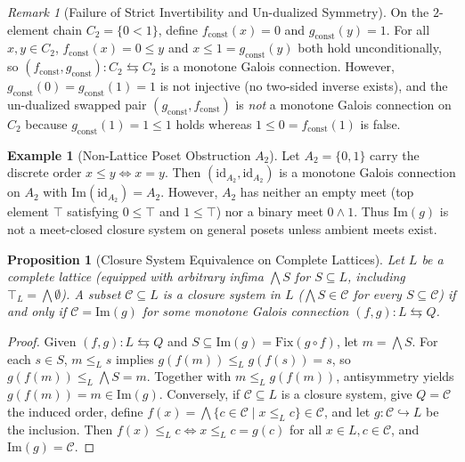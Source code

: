 \documentclass[11pt,a4paper]{article}
\newtheorem{proposition}[theorem]{Proposition}
\theoremstyle{definition}
\newtheorem{example}[theorem]{Example}
\theoremstyle{remark}
\newtheorem{remark}[theorem]{Remark}
\begin{document}
\begin{remark}[Failure of Strict Invertibility and Un-dualized Symmetry]\label{rem:non-inv}
On the $2$-element chain $C_2 = \{0 < 1\}$, define $f_{\mathrm{const}}(x) = 0$ and $g_{\mathrm{const}}(y) = 1$. For all $x, y \in C_2$, $f_{\mathrm{const}}(x) = 0 \le y$ and $x \le 1 = g_{\mathrm{const}}(y)$ both hold unconditionally, so $(f_{\mathrm{const}}, g_{\mathrm{const}}) : C_2 \leftrightarrows C_2$ is a monotone Galois connection. However, $g_{\mathrm{const}}(0) = g_{\mathrm{const}}(1) = 1$ is not injective (no two-sided inverse exists), and the un-dualized swapped pair $(g_{\mathrm{const}}, f_{\mathrm{const}})$ is \emph{not} a monotone Galois connection on $C_2$ because $g_{\mathrm{const}}(1) = 1 \le 1$ holds whereas $1 \le 0 = f_{\mathrm{const}}(1)$ is false.
\end{remark}

\begin{example}[Non-Lattice Poset Obstruction $A_2$]\label{ex:antichain}
Let $A_2 = \{0, 1\}$ carry the discrete order $x \le y \iff x = y$. Then $(\mathrm{id}_{A_2}, \mathrm{id}_{A_2})$ is a monotone Galois connection on $A_2$ with $\mathrm{Im}(\mathrm{id}_{A_2}) = A_2$. However, $A_2$ has neither an empty meet (top element $\top$ satisfying $0 \le \top$ and $1 \le \top$) nor a binary meet $0 \wedge 1$. Thus $\mathrm{Im}(g)$ is not a meet-closed closure system on general posets unless ambient meets exist.
\end{example}

\begin{proposition}[Closure System Equivalence on Complete Lattices]\label{prop:complete-closure}
Let $L$ be a complete lattice (equipped with arbitrary infima $\bigwedge S$ for $S \subseteq L$, including $\top_L = \bigwedge \emptyset$). A subset $\mathcal{C} \subseteq L$ is a \emph{closure system} in $L$ ($\bigwedge S \in \mathcal{C}$ for every $S \subseteq \mathcal{C}$) if and only if $\mathcal{C} = \mathrm{Im}(g)$ for some monotone Galois connection $(f, g) : L \leftrightarrows Q$.
\end{proposition}

\begin{proof}
Given $(f, g) : L \leftrightarrows Q$ and $S \subseteq \mathrm{Im}(g) = \mathrm{Fix}(g \circ f)$, let $m = \bigwedge S$. For each $s \in S$, $m \le_L s$ implies $g(f(m)) \le_L g(f(s)) = s$, so $g(f(m)) \le_L \bigwedge S = m$. Together with $m \le_L g(f(m))$, antisymmetry yields $g(f(m)) = m \in \mathrm{Im}(g)$. Conversely, if $\mathcal{C} \subseteq L$ is a closure system, give $Q = \mathcal{C}$ the induced order, define $f(x) = \bigwedge \{ c \in \mathcal{C} \mid x \le_L c \} \in \mathcal{C}$, and let $g : \mathcal{C} \hookrightarrow L$ be the inclusion. Then $f(x) \le_L c \iff x \le_L c = g(c)$ for all $x \in L, c \in \mathcal{C}$, and $\mathrm{Im}(g) = \mathcal{C}$.
\end{proof}
\end{document}

